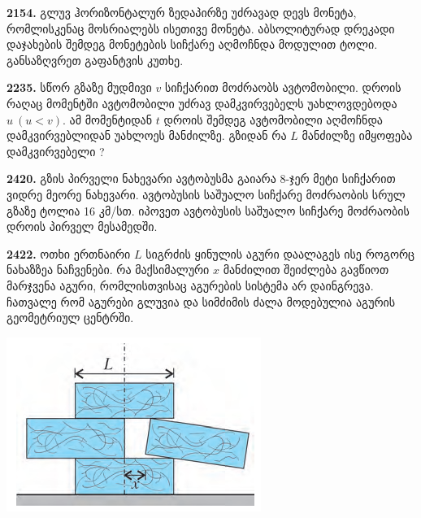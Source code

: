 \documentclass[12pt,a4paper,]{report}
\begin{document}
\textbf{2154.} გლუვ ჰორიზონტალურ ზედაპირზე უძრავად დევს მონეტა, რომლისკენაც მოსრიალებს ისეთივე მონეტა. აბსოლიტურად დრეკადი დაჯახების შემდეგ მონეტების სიჩქარე აღმოჩნდა მოდულით ტოლი. განსაზღვრეთ გაფანტვის კუთხე.

\textbf{2235.} სწორ გზაზე მუდმივი $v$ სიჩქარით მოძრაობს ავტომობილი. დროის რაღაც მომენტში ავტომობილი უძრავ დამკვირვებელს უახლოვდებოდა $u\ (u<v)$. ამ მომენტიდან $t$ დროის შემდეგ ავტომობილი აღმოჩნდა დამკვირვებლიდან უახლოეს მანძილზე. გზიდან რა $L$ მანძილზე იმყოფება დამკვირვებელი ? 

\textbf{2420.} გზის პირველი ნახევარი ავტობუსმა გაიარა 8-ჯერ მეტი სიჩქარით ვიდრე მეორე ნახევარი. ავტობუსის საშუალო სიჩქარე მოძრაობის სრულ გზაზე ტოლია 16 კმ/სთ. იპოვეთ ავტობუსის საშუალო სიჩქარე მოძრაობის დროის პირველ მესამედში.

\textbf{2422.} ოთხი ერთნაირი $L$ სიგრძის ყინულის აგური დაალაგეს ისე როგორც ნახაზზეა ნაჩვენები. რა მაქსიმალური $x$ მანძილით შეიძლება გავწიოთ მარჯვენა აგური, რომლისთვისაც აგურების სისტემა არ დაინგრევა. ჩათვალე რომ აგურები გლუვია და სიმძიმის ძალა მოდებულია აგურის გეომეტრიულ ცენტრში.
		\begin{center}
			\includegraphics[scale=0.6]{images/F2422.png}
		\end{center}
\end{document}
